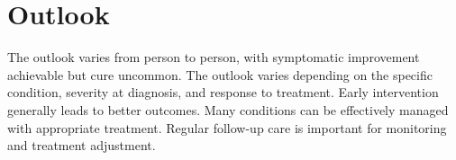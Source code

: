 \section{Outlook}
The outlook varies from person to person, with symptomatic improvement achievable but cure uncommon. The outlook varies depending on the specific condition, severity at diagnosis, and response to treatment. Early intervention generally leads to better outcomes. Many conditions can be effectively managed with appropriate treatment. Regular follow-up care is important for monitoring and treatment adjustment.
